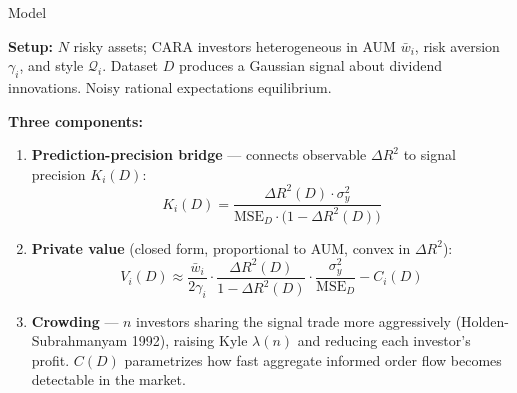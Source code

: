 \documentclass[12pt, aspectratio=169]{beamer}
\begin{document}
\begin{frame}{Model}

\footnotesize

\textbf{Setup:} $N$ risky assets; CARA investors heterogeneous in AUM
$\bar{w}_i$, risk aversion $\gamma_i$, and style $\mathcal{Q}_i$.
Dataset $D$ produces a Gaussian signal about dividend innovations.
Noisy rational expectations equilibrium.

\smallskip
\textbf{Three components:}

\begin{enumerate}\setlength\itemsep{2pt}

  \item \textbf{Prediction-precision bridge} --- connects observable $\Delta R^2$
  to signal precision $K_i(D)$:
  \vspace{-4pt}
  \[
    K_i(D) = \frac{\Delta R^2(D)\cdot\sigma^2_y}
                  {\mathrm{MSE}_D\cdot\bigl(1-\Delta R^2(D)\bigr)}
  \]
  \vspace{-10pt}

  \item \textbf{Private value} (closed form, proportional to AUM, convex in $\Delta R^2$):
  \vspace{-4pt}
  \[
    V_i(D) \approx
    \frac{\bar{w}_i}{2\gamma_i}
    \cdot\frac{\Delta R^2(D)}{1-\Delta R^2(D)}
    \cdot\frac{\sigma^2_y}{\mathrm{MSE}_D}
    - C_i(D)
  \]
  \vspace{-10pt}

  \item \textbf{Crowding} --- $n$ investors sharing the signal trade more
  aggressively (Holden-Subrahmanyam 1992), raising Kyle $\lambda(n)$ and
  reducing each investor's profit. $C(D)$ parametrizes how fast aggregate
  informed order flow becomes detectable in the market.

\end{enumerate}

\end{frame}
\end{document}
